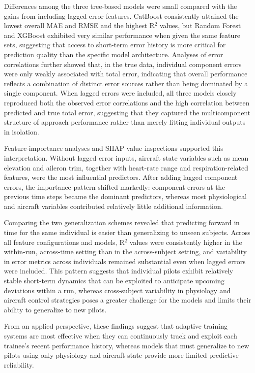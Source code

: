 \documentclass[11pt, a4paper]{article}
\begin{document}
Differences among the three tree-based models were small compared with the gains from including lagged error features. CatBoost consistently attained the lowest overall MAE and RMSE and the highest R$^2$ values, but Random Forest and XGBoost exhibited very similar performance when given the same feature sets, suggesting that access to short-term error history is more critical for prediction quality than the specific model architecture. Analyses of error correlations further showed that, in the true data, individual component errors were only weakly associated with total error, indicating that overall performance reflects a combination of distinct error sources rather than being dominated by a single component. When lagged errors were included, all three models closely reproduced both the observed error correlations and the high correlation between predicted and true total error, suggesting that they captured the multicomponent structure of approach performance rather than merely fitting individual outputs in isolation.

Feature-importance analyses and SHAP value inspections supported this interpretation. Without lagged error inputs, aircraft state variables such as mean elevation and aileron trim, together with heart-rate range and respiration-related features, were the most influential predictors. After adding lagged component errors, the importance pattern shifted markedly: component errors at the previous time steps became the dominant predictors, whereas most physiological and aircraft variables contributed relatively little additional information.

Comparing the two generalization schemes revealed that predicting forward in time for the same individual is easier than generalizing to unseen subjects. Across all feature configurations and models, R$^2$ values were consistently higher in the within-run, across-time setting than in the across-subject setting, and variability in error metrics across individuals remained substantial even when lagged errors were included. This pattern suggests that individual pilots exhibit relatively stable short‑term dynamics that can be exploited to anticipate upcoming deviations within a run, whereas cross‑subject variability in physiology and aircraft control strategies poses a greater challenge for the models and limits their ability to generalize to new pilots.

From an applied perspective, these findings suggest that adaptive training systems are most effective when they can continuously track and exploit each trainee’s recent performance history, whereas models that must generalize to new pilots using only physiology and aircraft state provide more limited predictive reliability.
\end{document}
